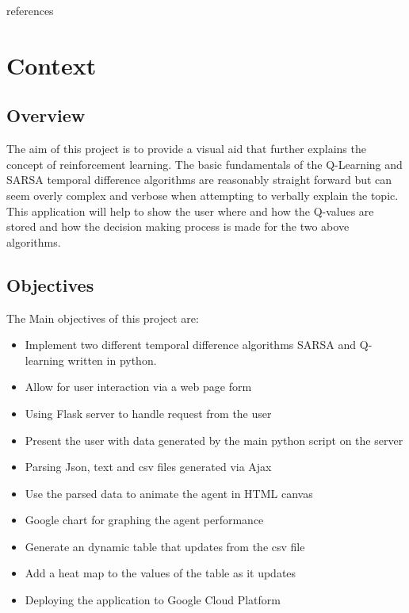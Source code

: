  references~\cite{einstein,knuthwebsite,latexcompanion,1introup63:online}

\chapter{Context}

\section{Overview}
The aim of this project is to provide a visual aid that further explains the concept of reinforcement learning. The basic fundamentals of the Q-Learning and SARSA temporal difference algorithms are reasonably straight forward but can seem overly complex and verbose when attempting to verbally explain the topic. This application will help to show the user where and how the Q-values are stored and how the decision making process is made for the two above algorithms.

\section{Objectives}
The Main objectives of this project are:
\begin{itemize}
	\item Implement two different temporal difference algorithms SARSA and Q-learning written in python.
	\item Allow for user interaction via a web page form
	\item Using Flask server to handle request from the user
	\item Present the user with data generated by the main python script on the server 
	\item Parsing Json, text and csv files generated via Ajax
	\item Use the parsed data to animate the agent in HTML canvas
	\item Google chart for graphing the agent performance
	\item Generate an dynamic table that updates from the csv file
	\item Add a heat map to the values of the table as it updates
	\item Deploying the application to Google Cloud Platform

\end{itemize}
 


